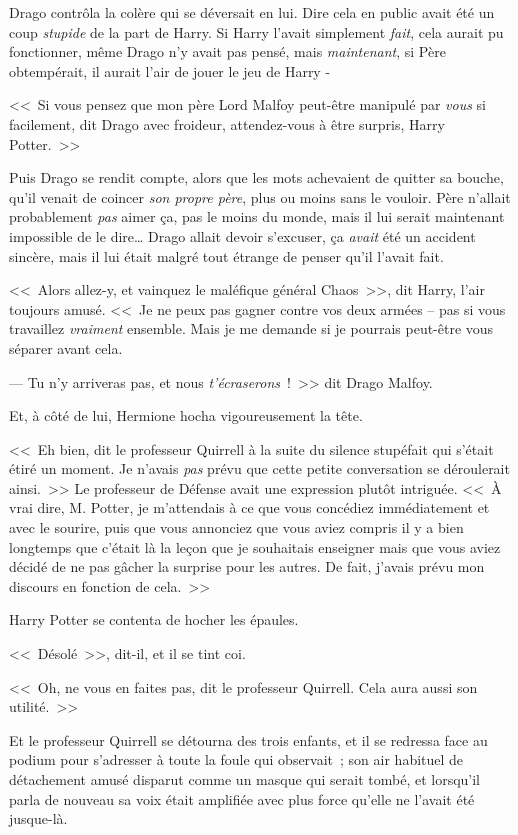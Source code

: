 Drago contrôla la colère qui se déversait en lui. Dire cela en public avait été un coup \emph{stupide} de la part de Harry. Si Harry l'avait simplement \emph{fait}, cela aurait pu fonctionner, même Drago n'y avait pas pensé, mais \emph{maintenant}, si Père obtempérait, il aurait l'air de jouer le jeu de Harry -

<<~Si vous pensez que mon père Lord Malfoy peut-être manipulé par \emph{vous} si facilement, dit Drago avec froideur, attendez-vous à être surpris, Harry Potter.~>>

Puis Drago se rendit compte, alors que les mots achevaient de quitter sa bouche, qu'il venait de coincer \emph{son propre père}, plus ou moins sans le vouloir. Père n'allait probablement \emph{pas} aimer ça, pas le moins du monde, mais il lui serait maintenant impossible de le dire… Drago allait devoir s'excuser, ça \emph{avait} été un accident sincère, mais il lui était malgré tout étrange de penser qu'il l'avait fait.

<<~Alors allez-y, et vainquez le maléfique général Chaos~>>, dit Harry, l'air toujours amusé. <<~Je ne peux pas gagner contre vos deux armées -- pas si vous travaillez \emph{vraiment} ensemble. Mais je me demande si je pourrais peut-être vous séparer avant cela.

--- Tu n'y arriveras pas, et nous \emph{t'écraserons}~!~>> dit Drago Malfoy.

Et, à côté de lui, Hermione hocha vigoureusement la tête.

<<~Eh bien, dit le professeur Quirrell à la suite du silence stupéfait qui s'était étiré un moment. Je n'avais \emph{pas} prévu que cette petite conversation se déroulerait ainsi.~>> Le professeur de Défense avait une expression plutôt intriguée. <<~À vrai dire, M. Potter, je m'attendais à ce que vous concédiez immédiatement et avec le sourire, puis que vous annonciez que vous aviez compris il y a bien longtemps que c'était là la leçon que je souhaitais enseigner mais que vous aviez décidé de ne pas gâcher la surprise pour les autres. De fait, j'avais prévu mon discours en fonction de cela.~>>

Harry Potter se contenta de hocher les épaules.

<<~Désolé~>>, dit-il, et il se tint coi.

<<~Oh, ne vous en faites pas, dit le professeur Quirrell. Cela aura aussi son utilité.~>>

Et le professeur Quirrell se détourna des trois enfants, et il se redressa face au podium pour s'adresser à toute la foule qui observait~; son air habituel de détachement amusé disparut comme un masque qui serait tombé, et lorsqu'il parla de nouveau sa voix était amplifiée avec plus force qu'elle ne l'avait été jusque-là.

